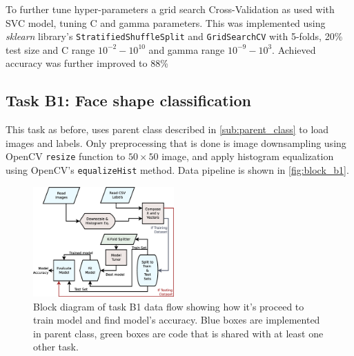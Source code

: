 \documentclass{article}
\begin{document}
To further tune hyper-parameters a grid search Cross-Validation as used with SVC model, tuning C and gamma parameters. This was implemented using \textit{sklearn} library's \texttt{StratifiedShuffleSplit} and \texttt{GridSearchCV} with 5-folds, 20\% test size and C range $10^{-2} - 10^{10}$ and gamma range $10^{-9} - 10^{3}$. Achieved accuracy was further improved to 88\%


\subsection{Task B1: Face shape classification}

This task as before, uses parent class described in \autoref{sub:parent_class} to load images and labels. Only preprocessing that is done is image downsampling using OpenCV \texttt{resize} function to $50 \times 50$ image, and apply histogram equalization using OpenCV's \texttt{equalizeHist} method. Data pipeline is shown in \autoref{fig:block_b1}. %


\begin{figure}[htb]
	\centering
	\includegraphics[width=0.48\textwidth]{graphics/B1_diagram.eps}
	\caption{Block diagram of task B1 data flow showing how it's proceed to train model and find model's accuracy. Blue boxes are implemented in parent class, green boxes are code that is shared with at least one other task.}
	\label{fig:block_b1}
\end{figure}
\end{document}
